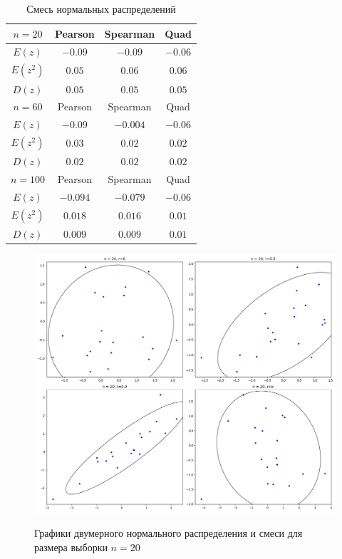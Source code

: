 \documentclass[a4]{article}
\begin{document}
\begin{table}[H]
	\caption{Смесь нормальных распределений}
	\label{tab:my_label3}
	\begin{center}
		\vspace{5mm}
		\begin{tabular}{|c|c|c|c|}
			\hline
			$ n=20 $ & Pearson & Spearman & Quad\\
			\hline
			$ E(z) $ & $ -0.09 $ & $ -0.09 $ & $ -0.06 $\\
			\hline
			$ E(z^{2}) $ & $ 0.05 $ & $ 0.06 $ & $ 0.06 $\\
			\hline
			$ D(z) $  & $ 0.05 $ & $ 0.05 $ & $ 0.05 $\\
			\hline
			$ n=60 $ & Pearson & Spearman & Quad\\
			\hline
			$ E(z) $ & $ -0.09 $ & $ -0.004 $ & $ -0.06 $\\
			\hline
			$ E(z^{2}) $ & $ 0.03 $ & $ 0.02 $ & $ 0.02 $\\
			\hline
			$ D(z) $  & $ 0.02 $ & $ 0.02 $ & $ 0.02 $ \\
			\hline
			$ n=100 $ & Pearson & Spearman & Quad\\
			\hline       
			$ E(z) $ & $ -0.094 $ & $ -0.079 $ & $ -0.06 $\\
			\hline
			$ E(z^{2}) $ & $ 0.018 $ & $ 0.016 $ & $ 0.01 $\\
			\hline
			$ D(z) $  & $ 0.009 $ & $ 0.009 $ & $ 0.01 $ \\
			\hline
		\end{tabular}
	\end{center}
\end{table}

\begin{figure}[H]
    \centering
    \caption{Графики двумерного нормального распределения и смеси для размера выборки $ n =20 $ }
    \includegraphics[scale = 0.5]{ellipse_n=20.png} 
    \label{fig:dis_norm_gis0}
\end{figure}
\end{document}
